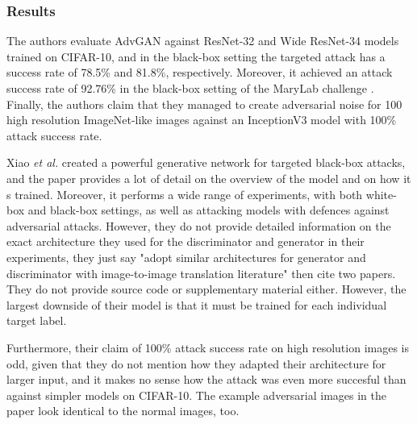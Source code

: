 \subsubsection{Results}

The authors evaluate AdvGAN against ResNet-32 and Wide ResNet-34 \cite{resnet} models trained on CIFAR-10, and in the black-box setting the targeted attack has a success rate of 78.5\% and 81.8\%, respectively. Moreover, it achieved an attack success rate of 92.76\% in the black-box setting of the MaryLab challenge \cite{madrylab}. Finally, the authors claim that they managed to create adversarial noise for 100 high resolution ImageNet-like images against an InceptionV3 model \cite{inceptionv3} with 100\% attack success rate.

Xiao \textit{et al.} created a powerful generative network for targeted black-box attacks, and the paper provides a lot of detail on the overview of the model and on how it s trained. Moreover, it performs a wide range of experiments, with both white-box and black-box settings, as well as attacking models with defences against adversarial attacks. However, they do not provide detailed information on the exact architecture they used for the discriminator and generator in their experiments, they just say "adopt similar architectures for generator and discriminator with image-to-image translation literature" then cite two papers. They do not provide source code or supplementary material either. However, the largest downside of their model is that it must be trained for each individual target label.

Furthermore, their claim of 100\% attack success rate on high resolution images is odd, given that they do not mention how they adapted their architecture for larger input, and it makes no sense how the attack was even more succesful than against simpler models on CIFAR-10. The example adversarial images in the paper look identical to the normal images, too.
